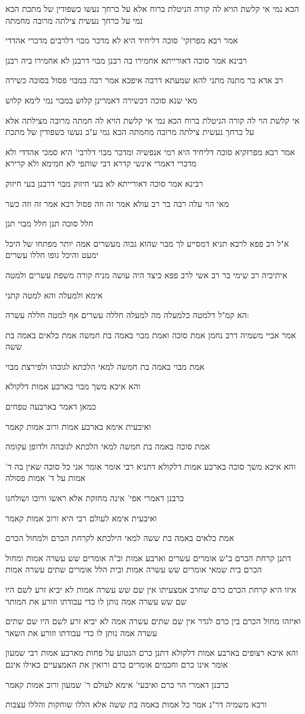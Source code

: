 \documentclass[12pt, openany]{book}
\newcommand{\sethebfont}{
\fontsize{10.5pt}{21.0pt} \selectfont
}
\newcommand{\textblock}[1]{
{\sethebfont #1\\}	
}
\begin{document}
\textblock{הכא נמי אי קלשת הויא לה קורה הניטלת ברוח אלא על כרחך נעשו כשפודין של מתכת הכא נמי על כרחך נעשית צילתה מרובה מחמתה}
\textblock{אמר רבא מפרזקי' סוכה דליחיד היא לא מדכר מבוי דלרבים מדכרי אהדדי}
\textblock{רבינא אמר סוכה דאורייתא אחמירו בה רבנן מבוי דרבנן לא אחמירו ביה רבנן}
\textblock{רב אדא בר מתנה מתני להא שמעתא דרבה איפכא אמר רבה במבוי פסול בסוכה כשירה}
\textblock{מאי שנא סוכה דכשירה דאמרינן קלוש במבוי נמי לימא קלוש}
\textblock{אי קלשת הוי לה קורה הניטלת ברוח הכא נמי אי קלשת הויא לה חמתה מרובה מצילתה אלא על כרחך נעשית צילתה מרובה מחמתה הכא נמי ע"כ נעשו כשפודין של מתכת}
\textblock{אמר רבא מפרזקיא סוכה דליחיד היא רמי אנפשיה ומדכר מבוי דלרבי' היא סמכי אהדדי ולא מדכרי דאמרי אינשי קדרא דבי שותפי לא חמימא ולא קרירא}
\textblock{רבינא אמר סוכה דאורייתא לא בעי חיזוק מבוי דרבנן בעי חיזוק}
\textblock{מאי הוי עלה רבה בר רב עולא אמר זה וזה פסול רבא אמר זה וזה כשר}
\textblock{חלל סוכה תנן חלל מבוי תנן}
\textblock{א"ל רב פפא לרבא תניא דמסייע לך מבוי שהוא גבוה מעשרים אמה יותר מפתחו של היכל ימעט והיכל גופו חללו עשרים}
\textblock{איתיביה רב שימי בר רב אשי לרב פפא כיצד היה עושה מניח קורה משפת עשרים ולמטה}
\textblock{אימא ולמעלה והא למטה קתני}
\textblock{הא קמ"ל דלמטה כלמעלה מה למעלה חללה עשרים אף למטה חללה עשרה:}
\textblock{אמר אביי משמיה דרב נחמן אמת סוכה ואמת מבוי באמה בת חמשה אמת כלאים באמה בת ששה}
\textblock{אמת מבוי באמה בת חמשה למאי הלכתא לגובהו ולפירצת מבוי}
\textblock{והא איכא משך מבוי בארבע אמות דלקולא}
\textblock{כמאן דאמר בארבעה טפחים}
\textblock{ואיבעית אימא בארבע אמות ורוב אמות קאמר}
\textblock{אמת סוכה באמה בת חמשה למאי הלכתא לגובהה ולדופן עקומה}
\textblock{והא איכא משך סוכה בארבע אמות דלקולא דתניא רבי אומר אומר אני כל סוכה שאין בה ד' אמות על ד' אמות פסולה}
\textblock{כרבנן דאמרי אפי' אינה מחזקת אלא ראשו ורובו ושולחנו}
\textblock{ואיבעית אימא לעולם רבי היא ורוב אמות קאמר}
\textblock{אמת כלאים באמה בת ששה למאי הילכתא לקרחת הכרם ולמחול הכרם}
\textblock{דתנן קרחת הכרם ב"ש אומרים עשרים וארבע אמות וב"ה אומרים שש עשרה אמות ומחול הכרם בית שמאי אומרים שש עשרה אמות ובית הלל אומרים שתים עשרה אמות}
\textblock{איזו היא קרחת הכרם כרם שחרב אמצעיתו אין שם שש עשרה אמות לא יביא זרע לשם היו שם שש עשרה אמה נותן לו כדי עבודתו וזורע את המותר}
\textblock{ואיזהו מחול הכרם בין כרם לגדר אין שם שתים עשרה אמה לא יביא זרע לשם היו שם שתים עשרה אמה נותן לו כדי עבודתו וזורע את השאר}
\textblock{והא איכא רצופים בארבע אמות דלקולא דתנן כרם הנטוע על פחות מארבע אמות רבי שמעון אומר אינו כרם וחכמים אומרים כרם ורואין את האמצעיים כאילו אינם}
\textblock{כרבנן דאמרי הוי כרם ואיבעי' אימא לעולם ר' שמעון ורוב אמות קאמר}
\textblock{ורבא משמיה דר"נ אמר כל אמות באמה בת ששה אלא הללו שוחקות והללו עצבות}
\end{document}
